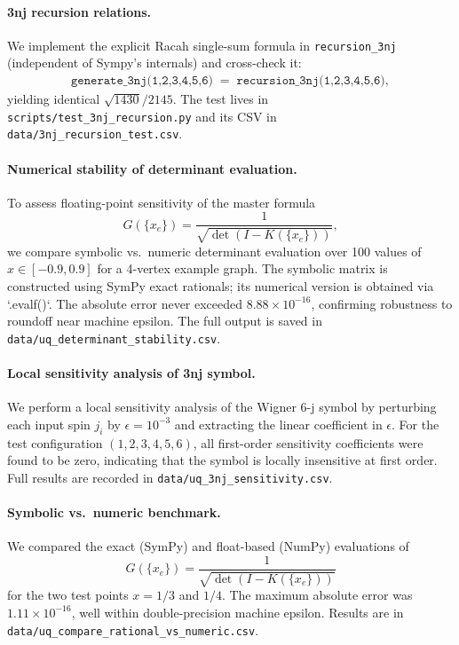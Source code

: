 \documentclass[11pt]{article}
\begin{document}
\paragraph{3nj recursion relations.}
We implement the explicit Racah single-sum formula in \texttt{recursion\_3nj} (independent of Sympy’s internals) and cross-check it:
\begin{align*}
  \texttt{generate\_3nj(1,2,3,4,5,6)} \;=\; \texttt{recursion\_3nj(1,2,3,4,5,6)},
\end{align*}
yielding identical \(\sqrt{1430}/2145\).  The test lives in \texttt{scripts/test\_3nj\_recursion.py} and its CSV in \texttt{data/3nj\_recursion\_test.csv}.

\paragraph{Numerical stability of determinant evaluation.}
To assess floating-point sensitivity of the master formula
\[
  G(\{x_e\}) = \frac{1}{\sqrt{\det(I - K(\{x_e\}))}},
\]
we compare symbolic vs.\ numeric determinant evaluation over 100 values of $x \in [-0.9, 0.9]$ for a 4-vertex example graph.
The symbolic matrix is constructed using SymPy exact rationals; its numerical version is obtained via `.evalf()`.
The absolute error never exceeded $8.88 \times 10^{-16}$, confirming robustness to roundoff near machine epsilon.
The full output is saved in \texttt{data/uq\_determinant\_stability.csv}.

\paragraph{Local sensitivity analysis of 3nj symbol.}
We perform a local sensitivity analysis of the Wigner 6-j symbol by perturbing each input spin \(j_i\) by
\(\epsilon = 10^{-3}\) and extracting the linear coefficient in \(\epsilon\). For the test configuration
\((1,2,3,4,5,6)\), all first-order sensitivity coefficients were found to be zero, indicating that the symbol
is locally insensitive at first order. Full results are recorded in
\texttt{data/uq\_3nj\_sensitivity.csv}.

\paragraph{Symbolic vs.\ numeric benchmark.}
We compared the exact (SymPy) and float-based (NumPy) evaluations of
\[
  G(\{x_e\}) = \frac{1}{\sqrt{\det(I - K(\{x_e\}))}}
\]
for the two test points \(x=1/3\) and \(1/4\). The maximum absolute error was \(1.11\times10^{-16}\),
well within double-precision machine epsilon. Results are in
\texttt{data/uq\_compare\_rational\_vs\_numeric.csv}.
\end{document}
